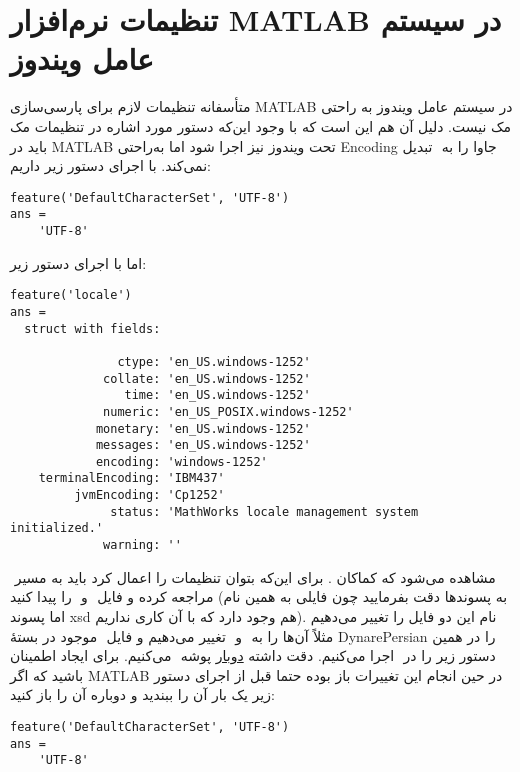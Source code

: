 \documentclass[12pt]{article}
\begin{document}
\section{تنظیمات نرم‌افزار MATLAB در سیستم عامل ویندوز}
متأسفانه تنظیمات لازم برای پارسی‌سازی MATLAB در سیستم عامل ویندوز به راحتی مک نیست. دلیل آن هم این است که با وجود این‌که دستور مورد اشاره در تنظیمات مک باید در MATLAB تحت ویندوز نیز اجرا شود اما به‌راحتی ‪Encoding‬‬‬ جاوا را به ‪‬‬‬‬ تبدیل نمی‌کند. با اجرای دستور زیر داریم:
\begin{latin}
\begin{lstlisting}[basicstyle=\scriptsize]
feature('DefaultCharacterSet', 'UTF-8')
ans =
    'UTF-8'
\end{lstlisting}
\end{latin}
اما با اجرای دستور زیر:
\begin{latin}
\begin{lstlisting}[basicstyle=\scriptsize]
feature('locale')
ans = 
  struct with fields:

               ctype: 'en_US.windows-1252'
             collate: 'en_US.windows-1252'
                time: 'en_US.windows-1252'
             numeric: 'en_US_POSIX.windows-1252'
            monetary: 'en_US.windows-1252'
            messages: 'en_US.windows-1252'
            encoding: 'windows-1252'
    terminalEncoding: 'IBM437'
         jvmEncoding: 'Cp1252'
              status: 'MathWorks locale management system initialized.'
             warning: ''
\end{lstlisting}
\end{latin}
مشاهده می‌شود که کماکان ‪‬‬‬‬. برای این‌که بتوان تنظیمات را اعمال کرد باید به مسیر ‪‬‬‬ مراجعه کرده و فایل ‪‬‬ و ‪‬‬‬‬ را پیدا کنید (به پسوند‌ها دقت بفرمایید چون فایلی به همین نام اما پسوند xsd هم وجود دارد که با آن کاری نداریم). نام این دو فایل را تغییر می‌دهیم مثلاً  آن‌ها را به  ‪‬‬ و ‪‬ تغییر می‌دهیم و ‬‬‬فایل ‪‬‬ ‬موجود در بستهٔ DynarePersian را در همین پوشه ‪‬‬‬ می‌کنیم. برای ایجاد اطمینان ‪\underline{دوبار}‬‬‬ دستور زیر را در ‪‬‬ اجرا می‌کنیم. دقت داشته باشید که اگر MATLAB در حین انجام این تغییرات باز بوده حتما قبل از اجرای دستور زیر یک بار آن را ببندید و دوباره آن را باز کنید:
\begin{latin}
\begin{lstlisting}[basicstyle=\scriptsize]
feature('DefaultCharacterSet', 'UTF-8')
ans =
    'UTF-8'
\end{lstlisting}
\end{latin}
\end{document}
